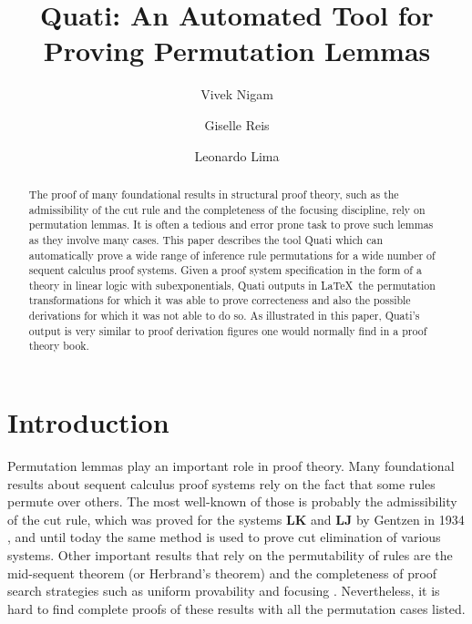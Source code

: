 \documentclass{llncs}
\title{Quati: An Automated Tool for Proving Permutation Lemmas}
\author{Vivek Nigam\inst{1} \and Giselle Reis\inst{2} \and Leonardo Lima\inst{1}}
\institute{Universidade Federal da Para\'{i}ba, Brazil
\and Technische Universit\"{a}t Wien, Austria
}
\begin{document}
\maketitle

\begin{abstract}
The proof of many foundational results in structural proof theory, such as the
admissibility of the cut rule and the completeness of the focusing discipline,
rely on permutation lemmas. It is often a tedious and error prone task to prove
such lemmas as they involve many cases. This paper describes the tool Quati
which can automatically prove
a wide range of inference rule
permutations for a wide number of sequent calculus proof systems. Given a proof system
specification in the form of a theory in linear logic with subexponentials,
Quati outputs in \LaTeX\ the permutation transformations for which it was able
to prove correcteness and also the 
possible derivations for which it was not able to do so. As illustrated in this
paper, Quati's output is very similar to proof derivation figures one would
normally find in a proof theory book. 
\end{abstract}

\section{Introduction}

Permutation lemmas play an important role in proof theory. Many foundational
results about sequent calculus proof systems rely on the fact that some rules
permute over others. The most well-known of those is probably the admissibility of
the cut rule, which was proved for the systems \textbf{LK} and \textbf{LJ} by
Gentzen in 1934 \cite{gentzen}, and until today the same method is used to prove
cut elimination of various systems. Other important results that rely on the
permutability of rules are the mid-sequent theorem (or Herbrand's theorem)
\cite{herbrand} and the completeness of proof search strategies such as uniform
provability \cite{} and focusing \cite{andreoli}. Nevertheless, it is hard to
find complete proofs of these results with all the permutation cases listed.
\end{document}
